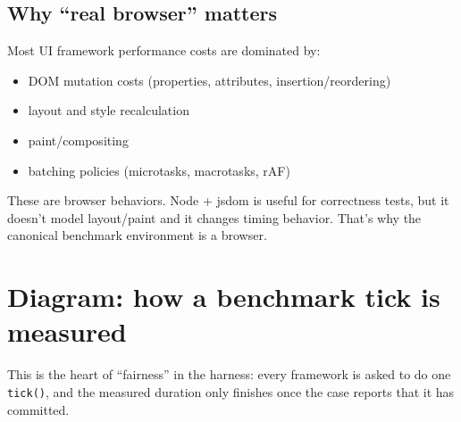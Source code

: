 \subsection{Why ``real browser'' matters}

Most UI framework performance costs are dominated by:

\begin{itemize}
\item DOM mutation costs (properties, attributes, insertion/reordering)
\item layout and style recalculation
\item paint/compositing
\item batching policies (microtasks, macrotasks, rAF)
\end{itemize}

These are browser behaviors.
Node + jsdom is useful for correctness tests, but it doesn't model layout/paint and it changes timing behavior.
That's why the canonical benchmark environment is a browser.

\section*{Diagram: how a benchmark tick is measured}
\begin{center}
\end{center}

This is the heart of ``fairness'' in the harness: every framework is asked to do one \texttt{tick()}, and the measured duration only finishes once the case reports that it has committed.

